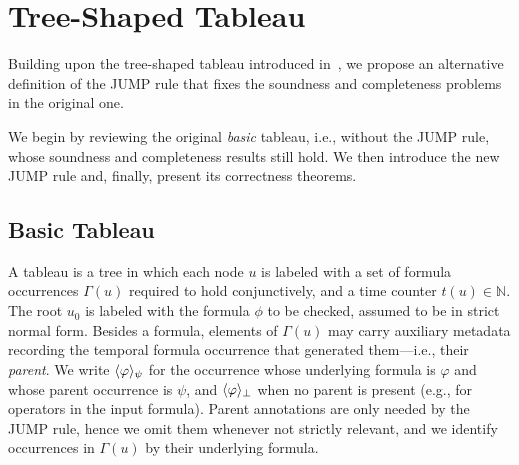 \documentclass{easychair}
\begin{document}
\section{Tree-Shaped Tableau}
\label{sec:tableau}

Building upon the tree-shaped tableau introduced in~\cite{MelaniBC25}, we propose an alternative definition of the \textsf{JUMP} rule that fixes the soundness and completeness problems in the original one.

We begin by reviewing the original \emph{basic} tableau, i.e., without the \textsf{JUMP} rule, whose soundness and completeness results still hold.
We then introduce the new \textsf{JUMP} rule and, finally, present its correctness theorems.


\subsection{Basic Tableau}

A tableau is a tree in which each node $u$ is labeled with a set of formula occurrences $\Gamma(u)$ required to hold conjunctively, and a time counter $t(u) \in \mathbb{N}$. 
%
The root $u_0$ is labeled with the formula $\phi$ to be checked, assumed to be in strict normal form.
%
Besides a formula, elements of $\Gamma(u)$ may carry auxiliary metadata recording the temporal formula occurrence that generated them---i.e., their \emph{parent}.
%
We write $\langle \varphi\rangle_{\psi}$ for the occurrence whose underlying formula is $\varphi$ and whose parent occurrence is $\psi$, and $\langle \varphi\rangle_{\bot}$ when no parent is present (e.g., for operators in the input formula).
Parent annotations are only needed by the \textsf{JUMP} rule, hence we omit them whenever not strictly relevant, and we identify occurrences in $\Gamma(u)$ by their underlying formula.
\end{document}
